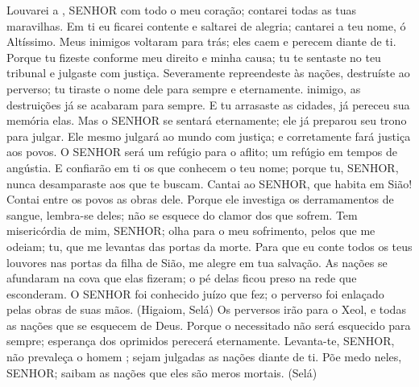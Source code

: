 {\PP 
  Louvarei a
{},  SENHOR com todo o meu coração; contarei todas as tuas maravilhas.
  Em ti eu ficarei contente e saltarei de alegria; cantarei a teu nome, ó Altíssimo.
  Meus inimigos voltaram para trás; eles caem e perecem diante de ti.
  Porque tu fizeste conforme meu direito e minha causa; tu te sentaste no teu tribunal e julgaste com justiça.
  Severamente repreendeste às nações, destruíste ao perverso; tu tiraste o nome dele para sempre e eternamente.
   inimigo, as destruições já se acabaram para sempre. E tu arrasaste as cidades,
{} já pereceu sua memória
{} elas.
  Mas o SENHOR se sentará
{} eternamente; ele já preparou seu trono para julgar.
  Ele mesmo julgará ao mundo com justiça; e corretamente fará justiça aos povos.
  O SENHOR será um refúgio para o aflito; um refúgio em tempos de angústia.
  E confiarão em ti os que conhecem o teu nome; porque tu, SENHOR, nunca desamparaste aos que te buscam.
  Cantai ao SENHOR, que habita em Sião! Contai entre os povos as obras dele.
  Porque ele investiga os derramamentos de sangue,
{} lembra-se deles; não se esquece do clamor dos que sofrem.
  Tem misericórdia de mim, SENHOR; olha para o meu sofrimento,
{} pelos que me odeiam; tu, que me levantas
{} das portas da morte.
  Para que eu conte todos os teus louvores nas portas da filha de Sião,
{} me alegre em tua salvação.
  As nações se afundaram na cova que elas fizeram; o pé delas ficou preso na rede que esconderam.
  O SENHOR foi conhecido
{} juízo que fez; o perverso foi enlaçado pelas obras de suas
{} mãos. (Higaiom, Selá)
  Os perversos irão
 para o Xeol,
 e todas as nações que se esquecem de Deus.
  Porque o necessitado não será esquecido para sempre;
{} esperança dos oprimidos perecerá eternamente.
  Levanta-te, SENHOR, não prevaleça o homem
{} ; sejam julgadas as nações diante de ti.
  Põe medo neles, SENHOR; saibam as nações que eles são meros mortais. (Selá)
\par }

